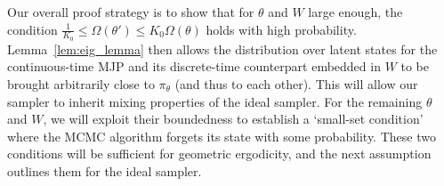 Our overall proof strategy is to show that for $\theta$ and $W$ large enough, 
the condition $ \frac{1}{K_0} \le \Omega(\theta') \le K_0 \Omega(\theta)$ holds with 
high probability. Lemma~\ref{lem:eig_lemma} then allows the distribution 
over latent states for the continuous-time MJP and its discrete-time 
counterpart embedded in $W$ to be brought arbitrarily close to $\pi_\theta$  
(and thus to each other).
This will allow our sampler 
to inherit mixing properties of the ideal sampler. For the remaining 
$\theta$ and $W$, we will exploit their boundedness to establish a 
`small-set condition' where the MCMC algorithm forgets its state with 
some probability. These two conditions will be sufficient for 
geometric ergodicity, and the next assumption outlines them for the ideal 
sampler.

